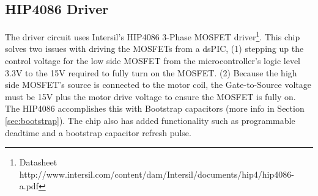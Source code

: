 \documentclass{article}
\begin{document}
\subsection{HIP4086 Driver}
The driver circuit uses Intersil's HIP4086 3-Phase MOSFET driver\footnote{Datasheet http://www.intersil.com/content/dam/Intersil/documents/hip4/hip4086-a.pdf}. This chip solves two issues with driving the MOSFETs from a dsPIC, (1) stepping up the control voltage for the low side MOSFET from the microcontroller's logic level 3.3V to the 15V required to fully turn on the MOSFET. (2) Because the high side MOSFET's source is connected to the motor coil, the Gate-to-Source voltage must be 15V plus the motor drive voltage to ensure the MOSFET is fully on. The HIP4086 accomplishes this with Bootstrap capacitors (more info in Section \ref{sec:bootstrap}). The chip also has added functionality such as programmable deadtime and a bootstrap capacitor refresh pulse. 
\end{document}
